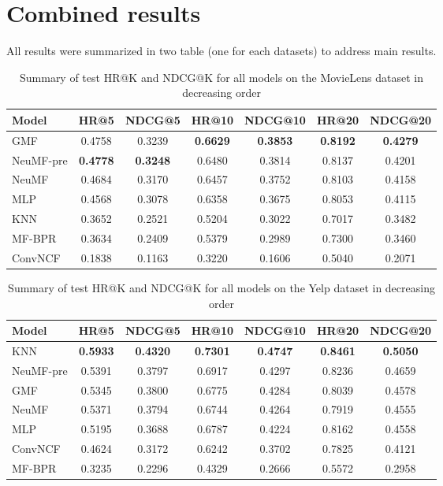 \documentclass[11pt]{article}
\begin{document}
\section{Combined results}
All results were summarized in two table (one for each datasets) to address main results.
\begin{table}[H]
\centering
\caption{Summary of test HR@K and NDCG@K for all models on the MovieLens dataset in decreasing order}
\label{tab:summary_movielens}
\begin{tabular}{lcccccc}
\hline
\textbf{Model} & \textbf{HR@5} & \textbf{NDCG@5} & \textbf{HR@10} & \textbf{NDCG@10} & \textbf{HR@20} & \textbf{NDCG@20} \\
\hline
GMF        & 0.4758 & 0.3239 & \textbf{0.6629} & \textbf{0.3853} & \textbf{0.8192} & \textbf{0.4279} \\
NeuMF-pre  & \textbf{0.4778} & \textbf{0.3248} & 0.6480 & 0.3814 & 0.8137 & 0.4201 \\
NeuMF      & 0.4684 & 0.3170 & 0.6457 & 0.3752 & 0.8103 & 0.4158 \\
MLP        & 0.4568 & 0.3078 & 0.6358 & 0.3675 & 0.8053 & 0.4115 \\


KNN        & 0.3652 & 0.2521 & 0.5204 & 0.3022 & 0.7017 & 0.3482 \\
MF-BPR     & 0.3634 & 0.2409 & 0.5379 & 0.2989 & 0.7300 & 0.3460 \\
ConvNCF    & 0.1838 & 0.1163 & 0.3220 & 0.1606 & 0.5040 & 0.2071 \\
\hline
\end{tabular}
\end{table}


\begin{table}[H]
\centering
\caption{Summary of test HR@K and NDCG@K for all models on the Yelp dataset in decreasing order}
\label{tab:summary_yelp}
\begin{tabular}{lcccccc}
\hline
\textbf{Model} & \textbf{HR@5} & \textbf{NDCG@5} & \textbf{HR@10} & \textbf{NDCG@10} & \textbf{HR@20} & \textbf{NDCG@20} \\
\hline
KNN        & \textbf{0.5933} & \textbf{0.4320} & \textbf{0.7301} & \textbf{0.4747} & \textbf{0.8461} & \textbf{0.5050} \\
NeuMF-pre  & 0.5391 & 0.3797 & 0.6917 & 0.4297 & 0.8236 & 0.4659 \\
GMF        & 0.5345 & 0.3800 & 0.6775 & 0.4284 & 0.8039 & 0.4578 \\
NeuMF      & 0.5371 & 0.3794 & 0.6744 & 0.4264 & 0.7919 & 0.4555 \\
MLP        & 0.5195 & 0.3688 & 0.6787 & 0.4224 & 0.8162 & 0.4558 \\
ConvNCF    & 0.4624 & 0.3172 & 0.6242 & 0.3702 & 0.7825 & 0.4121 \\
MF-BPR     & 0.3235 & 0.2296 & 0.4329 & 0.2666 & 0.5572 & 0.2958 \\

\hline
\end{tabular}
\end{table}
\end{document}
